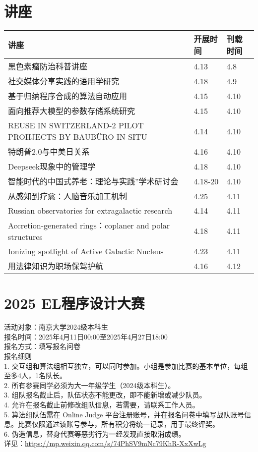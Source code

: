 \documentclass[letterpaper, 12pt]{article}
\begin{document}
\begin{multicols}{2}
\pagebreak

\section{讲座}
\begin{tabular}{|>{\centering\arraybackslash}m{}|m{}|m{}|}
    \hline
    讲座 & 开展时间 & 刊载时间\\
    \hline\hline
    黑色素瘤防治科普讲座 & 4.13 & 4.8\\\hline
    社交媒体分享实践的语用学研究 & 4.18 & 4.9\\\hline
    基于归纳程序合成的算法自动应用 & 4.15 & 4.10\\\hline
    面向推荐大模型的参数存储系统研究 & 4.15 & 4.10\\\hline
    REUSE IN SWITZERLAND-2 PILOT PROHJECTS BY BAUBÜRO IN SITU & 4.14 & 4.10\\\hline
    特朗普2.0与中美日关系 & 4.16 & 4.10\\\hline
    Deepseek现象中的管理学 & 4.18 & 4.10\\\hline
    智能时代的中国式养老：理论与实践”学术研讨会 & 4.18-20 & 4.10\\\hline
    从感知到疗愈：人脑音乐加工机制 & 4.25 & 4.11\\\hline
    Russian observatories for extragalactic research & 4.14 & 4.11\\\hline
    Accretion-generated rings：coplaner and polar structures & 4.18 & 4.11\\\hline
    Ionizing spotlight of Active Galactic Nucleus & 4.23 & 4.11\\\hline
    用法律知识为职场保驾护航 & 4.16 & 4.12\\\hline
\end{tabular}

\section{2025 EL程序设计大赛}
活动对象：南京大学2024级本科生
\\报名时间：2025年4月11日00:00至2025年4月27日18:00
\\报名方式：填写报名问卷
\\报名细则
\\1. 交互组和算法组相互独立，可以同时参加。小组是参加比赛的基本单位，每组至多4人，1名队长。
\\2. 所有参赛同学必须为大一年级学生（2024级本科生）。
\\3. 组队报名截止后，队伍状态不能更改，即不能新增或减少队员。
\\4. 允许在报名截止前修改组队信息，若需要，请联系工作人员。
\\5. 算法组队伍需在 Online Judge 平台注册账号，并在报名问卷中填写战队账号信息。比赛仅限通过该账号参与，所有积分将统一记录，用于最终评奖。
\\6. 伪造信息，替身代赛等恶劣行为一经发现直接取消成绩。
\\详见：\url{https://mp.weixin.qq.com/s/74PhSV9mNc79KhR-XxXwLg}


\end{multicols}
\end{document}
